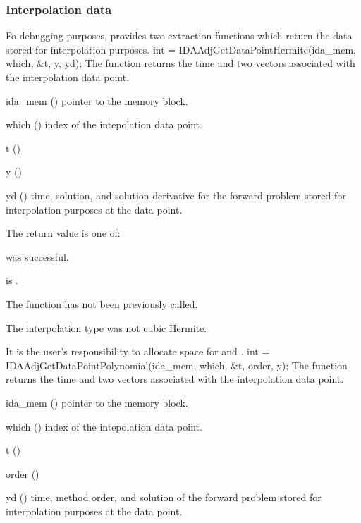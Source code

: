 \subsubsection{Interpolation data}
Fo debugging purposes, {\idaa} provides two extraction functions which 
return the data stored for interpolation purposes.
{
  int = IDAAdjGetDataPointHermite(ida\_mem, which, \&t, y, yd);
}
{
  The function  returns the
  time and two vectors associated with the  interpolation data point.
}
{
  \begin{args}
  \item[ida\_mem] ()
    pointer to the {\idas} memory block.
  \item[which] ()
    index of the intepolation data point.
  \item[t] ()
  \item[y] ()
  \item[yd] ()
    time, solution, and solution derivative for the forward problem 
    stored for interpolation purposes at the  data point.
  \end{args}
}
{
  The return value  is one of:
  \begin{args}
  \item[\Id{IDA\_SUCCESS}] 
     was successful.
  \item[\Id{IDA\_MEM\_NULL}] 
     is .
  \item[\Id{IDA\_NO\_ADJ}]
    The function  has not been previously called.
  \item[\Id{IDA\_ILL\_INPUT}]
    The interpolation type was not cubic Hermite.
  \end{args}
}
{
  It is the user's responsibility to allocate space for  and .
}
{
  int = IDAAdjGetDataPointPolynomial(ida\_mem, which, \&t, order, y);
}
{
  The function  returns the
  time and two vectors associated with the  interpolation data point.
}
{
  \begin{args}
  \item[ida\_mem] ()
    pointer to the {\idas} memory block.
  \item[which] ()
    index of the intepolation data point.
  \item[t] ()
  \item[order] ()
  \item[yd] ()
    time, method order, and solution of the forward problem 
    stored for interpolation purposes at the  data point.
  \end{args}
}
